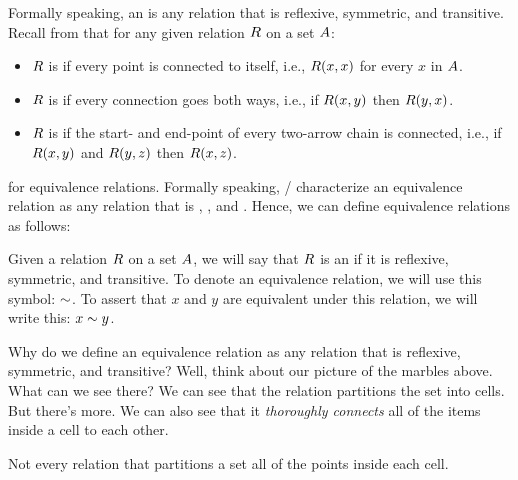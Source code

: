 \documentclass[../../../main.tex]{subfiles}
\begin{document}
\begin{terminology}
  Formally speaking, an  is any relation that is reflexive, symmetric, and transitive. Recall from  that for any given relation $R$ on a set $A$:
  
  \begin{itemize}
    \item $R$ is  if every point is connected to itself, i.e., $R(x, x)$ for every $x$ in $A$.
    \item $R$ is  if every connection goes both ways, i.e., if $R(x, y)$ then $R(y, x)$.
    \item $R$ is  if the start- and end-point of every two-arrow chain is connected, i.e., if $R(x, y)$ and $R(y, z)$ then $R(x, z)$.
  \end{itemize}
\end{terminology}

 for equivalence relations. Formally speaking, \mathers/ characterize an equivalence relation as any relation that is , , and . Hence, we can define equivalence relations as follows:

\begin{fdefinition}
  Given a relation $R$ on a set $A$, we will say that $R$ is an  if it is reflexive, symmetric, and transitive. To denote an equivalence relation, we will use this symbol: $\equivalence/$. To assert that $x$ and $y$ are equivalent under this relation, we will write this: $x \equivalence/ y$.
\end{fdefinition}

Why do we define an equivalence relation as any relation that is reflexive, symmetric, and transitive? Well, think about our picture of the marbles above. What can we see there? We can see that the relation partitions the set into cells. But there's more. We can also see that it \emph{thoroughly connects} all of the items inside a cell to each other.

\begin{aside}
  \begin{remark}
    Not every relation that partitions a set  all of the points inside each cell.
  \end{remark}
\end{aside}
\end{document}
